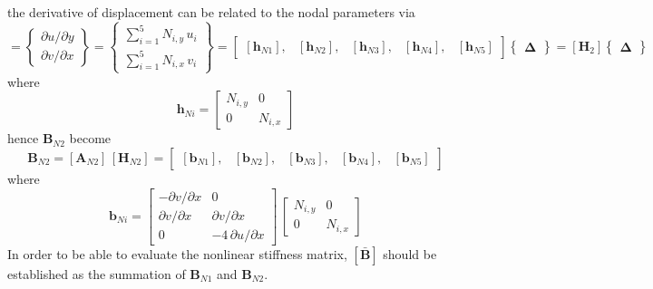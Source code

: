 the derivative of displacement can be related to the nodal parameters via
\begin{equation}
[\boldsymbol{\theta}_{N2}] =  \begin{Bmatrix}
\partial u / \partial y\\
\partial v / \partial x
\end{Bmatrix}
= \begin{Bmatrix}
\sum\nolimits_{i=1}^5 N_{i,y} \, u_i\\
\sum\nolimits_{i=1}^5 N_{i,x} \, v_i
\end{Bmatrix} 
= \begin{bmatrix}
[\mathbf{h}_{N1}], & [\mathbf{h}_{N2}], & [\mathbf{h}_{N3}], & [\mathbf{h}_{N4}], & [\mathbf{h}_{N5}] 
\end{bmatrix}  \begin{Bmatrix} \boldsymbol{\Delta} \end{Bmatrix}  
= [\mathbf{H}_2] \begin{Bmatrix} \boldsymbol{\Delta} \end{Bmatrix} 
\end{equation}
where 
\begin{equation}
\mathbf{h}_{Ni} = \begin{bmatrix}
N_{i,y} &  0  \\
0 & N_{i,x}  \end{bmatrix} 
\end{equation}
hence $\mathbf{B}_{N2}$ become
\begin{equation}
\mathbf{B}_{N2} = [\mathbf{A}_{N2}] \, [\mathbf{H}_{N2}] = \begin{bmatrix}
[\mathbf{b}_{N1}], & [\mathbf{b}_{N2}], & [\mathbf{b}_{N3}], & [\mathbf{b}_{N4}], & [\mathbf{b}_{N5}] 
\end{bmatrix} 
\end{equation}
where
\begin{equation}
\mathbf{b}_{Ni} = \begin{bmatrix}
- \partial v / \partial x &  0 \\
\partial v / \partial x &  \partial v / \partial x \\
0 & -4 \, \partial u / \partial x  \end{bmatrix} \, \begin{bmatrix}
N_{i,y} &  0  \\
0 & N_{i,x}  \end{bmatrix} 
\end{equation}
In order to be able to evaluate the nonlinear stiffness matrix, $[\mathbf{\bar{B}}]$ should be established as the summation of $ \mathbf{B}_{N1}$ and $\mathbf{B}_{N2}$.
